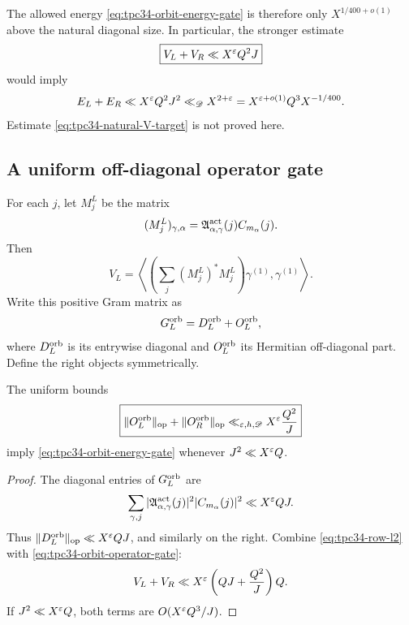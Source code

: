 The allowed energy \eqref{eq:tpc34-orbit-energy-gate} is therefore only
\(X^{1/400+o(1)}\) above the natural diagonal size.  In particular, the
stronger estimate
\begin{equation}
 \boxed{
 V_L+V_R\ll X^\varepsilon Q^2J}
 \label{eq:tpc34-natural-V-target}
\end{equation}
would imply
\begin{equation}
 E_L+E_R
 \ll X^\varepsilon Q^2J^2
 \ll_{\mathscr D} X^{2+\varepsilon}
 =X^{\varepsilon+o(1)}Q^3X^{-1/400}.
 \label{eq:tpc34-natural-V-output}
\end{equation}
Estimate \eqref{eq:tpc34-natural-V-target} is not proved here.

\subsection{A uniform off-diagonal operator gate}

For each \(j\), let \(M_j^L\) be the matrix
\begin{equation}
 (M_j^L)_{\gamma,\alpha}
 =\mathfrak A_{\alpha,\gamma}^{\rm act}(j)C_{m_\alpha}(j).
 \label{eq:tpc34-slice-matrix}
\end{equation}
Then
\begin{equation}
 V_L
 =\left\langle
 \left(\sum_j(M_j^L)^*M_j^L\right)\gamma^{(1)},
 \gamma^{(1)}
 \right\rangle.
 \label{eq:tpc34-slice-Gram}
\end{equation}
Write this positive Gram matrix as
\begin{equation}
 G_L^{\rm orb}=D_L^{\rm orb}+O_L^{\rm orb},
 \label{eq:tpc34-orbit-Gram-split}
\end{equation}
where \(D_L^{\rm orb}\) is its entrywise diagonal and
\(O_L^{\rm orb}\) its Hermitian off-diagonal part.  Define the right
objects symmetrically.

\begin{proposition}
\label{prop:tpc34-orbit-operator-gate}
The uniform bounds
\begin{equation}
 \boxed{
 \|O_L^{\rm orb}\|_{\operatorname{op}}
 +\|O_R^{\rm orb}\|_{\operatorname{op}}
 \ll_{\varepsilon,h,\mathscr D}X^\varepsilon\frac{Q^2}{J}}
 \label{eq:tpc34-orbit-operator-gate}
\end{equation}
imply \eqref{eq:tpc34-orbit-energy-gate} whenever \(J^2\ll X^\varepsilon Q\).
\end{proposition}

\begin{proof}
The diagonal entries of \(G_L^{\rm orb}\) are
\[
 \sum_{\gamma,j}
 |\mathfrak A_{\alpha,\gamma}^{\rm act}(j)|^2
 |C_{m_\alpha}(j)|^2
 \ll X^\varepsilon QJ.
\]
Thus \(\|D_L^{\rm orb}\|_{\operatorname{op}}\ll X^\varepsilon QJ\), and similarly on the
right.  Combine \eqref{eq:tpc34-row-l2} with
\eqref{eq:tpc34-orbit-operator-gate}:
\[
 V_L+V_R
 \ll X^\varepsilon\left(QJ+\frac{Q^2}{J}\right)Q.
\]
If \(J^2\ll X^\varepsilon Q\), both terms are
\(O(X^\varepsilon Q^3/J)\).
\end{proof}

